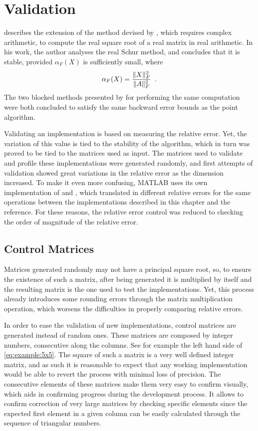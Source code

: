 \documentclass[../thesis]{subfiles}
\begin{document}
	\section{Validation}

	 describes the extension of the method devised by \citeauthor{bjorck:hammarling:1983}, which requires complex arithmetic, to compute the real square root of a real matrix in real arithmetic. In his work, the author analyses the real Schur method, and concludes that it is stable, provided $\alpha_F(X)$ is sufficiently small, where $$\alpha_F(X) = \frac{\lVert X\rVert_F^2}{\lVert A\rVert_F^2}\enspace.$$ The two blocked methods presented by  for performing the same computation were both concluded to satisfy the same backward error bounds as the point algorithm.

	Validating an implementation is based on measuring the relative error. Yet, the variation of this value is tied to the stability of the algorithm, which in turn was proved to be tied to the matrices used as input. The matrices used to validate and profile these implementations were generated randomly, and first attempts of validation showed great variations in the relative error as the dimension increased. To make it even more confusing, MATLAB uses its own implementation of \blas and \lapack, which translated in different relative errors for the same operations between the implementations described in this chapter and the reference. For these reasons, the relative error control was reduced to checking the order of magnitude of the relative error.

		\subsection{Control Matrices}
		Matrices generated randomly may not have a principal square root, so, to ensure the existence of such a matrix, after being generated it is multiplied by itself and the resulting matrix is the one used to test the implementations. Yet, this process already introduces some rounding errors through the matrix multiplication operation, which worsens the difficulties in properly comparing relative errors.

		In order to ease the validation of new implementations, control matrices are generated instead of random ones. These matrices are composed by integer numbers, consecutive along the columns. See for example the left hand side of \cref{eq:example:5x5}. The square of such a matrix is a very well defined integer matrix, and as such it is reasonable to expect that any working implementation would be able to revert the process with minimal loss of precision. The consecutive elements of these matrices make them very easy to confirm visually, which aids in confirming progress during the development process. It allows to confirm correction of very large matrices by checking specific elements since the expected first element in a given column can be easily calculated through the sequence of triangular numbers.
\end{document}
